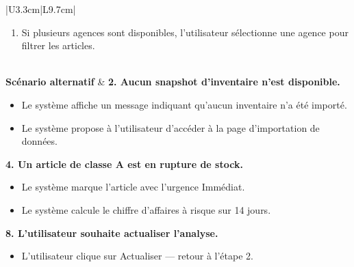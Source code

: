 \documentclass[a4paper,12pt]{report}
\begin{document}
\begin{longtable}{|U{3.3cm}|L{9.7cm}|}
\begin{enumerate}
    \item Si plusieurs agences sont disponibles, l'utilisateur sélectionne une agence pour filtrer les articles.
\end{enumerate} \\
\hline
\textbf{Scénario alternatif} &
\textbf{2. Aucun snapshot d'inventaire n'est disponible.}
\begin{itemize}
    \item[2.1] Le système affiche un message indiquant qu'aucun inventaire n'a été importé.
    \item[2.2] Le système propose à l'utilisateur d'accéder à la page d'importation de données.
\end{itemize}
\textbf{4. Un article de classe A est en rupture de stock.}
\begin{itemize}
    \item[4.1] Le système marque l'article avec l'urgence Immédiat.
    \item[4.2] Le système calcule le chiffre d'affaires à risque sur 14 jours.
\end{itemize}
\textbf{8. L'utilisateur souhaite actualiser l'analyse.}
\begin{itemize}
    \item[8.1] L'utilisateur clique sur Actualiser --- retour à l'étape 2.
\end{itemize} 
\end{longtable}
\end{document}
